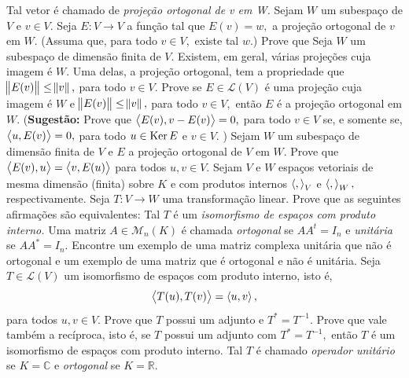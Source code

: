 \documentclass[11pt,a4paper]{article}
\begin{document}
Tal vetor é chamado de \emph{projeção ortogonal de v em W.}
\solucao{}
 Sejam $W$ um subespaço de $V$ e $v \in V.$ Seja $E \colon V \to V$ a função tal que $E(v) = w,$ a projeção
ortogonal de $v$ em $W.$ (Assuma que, para todo $v \in V,$ existe tal $w.$) Prove que 
\solucao{}
 Seja $W$ um subespaço de dimensão finita de $V.$ Existem, em geral, várias projeções cuja imagem é $W.$ Uma delas, a projeção ortogonal, tem a propriedade que $\norm{E(v)} \le \norm{v},$ para
todo $v \in V.$ Prove se $E \in \mathcal{L}(V)$ é uma projeção cuja imagem é $W$ e $\norm{E(v)} \le \norm{v},$ para todo $v \in V,$ então $E$ é a projeção ortogonal em $W.$
(\textbf{Sugestão:} Prove que $\left\langle E(v), v - E(v) \right\rangle = 0,$ para todo $v \in V$ se, e somente se, $\left\langle u, E(v) \right\rangle = 0,$
para todo $u \in \operatorname{Ker} E$ e $v \in V.$ )
\solucao{}
  Sejam $W$ um subespaço de dimensão finita de $V$ e $E$ a projeção ortogonal de $V$ em $W$. Prove que $\left\langle E(v), u \right\rangle = \left\langle v, E(u) \right\rangle$ para todos $u, v \in V.$
\solucao{}
 Sejam $V$ e $W$ espaços vetoriais de mesma dimensão (finita) sobre $K$ e com produtos internos $\left\langle , \right\rangle_V$ e $\left\langle , \right\rangle_W,$ respectivamente. Seja $T : V \rightarrow W$ uma transformação linear. Prove que as
seguintes afirmações são equivalentes: 
Tal $T$ é um \emph{isomorfismo de espaços com produto interno.}
\solucao{}
 Uma matriz $A \in \mathcal{M}_n(K)$ é chamada \emph{ortogonal} se $AA^t = I_n$ e \emph{unitária} se $AA^{*} = I_n.$ Encontre um exemplo de uma matriz complexa unitária que não é ortogonal e um exemplo de uma matriz que é ortogonal e não é unitária.
\solucao{}
 Seja $T \in \mathcal{L}(V)$ um isomorfismo de espaços com produto interno, isto é,
\[\left\langle T(u), T(v) \right\rangle = \left\langle u,v \right\rangle,
\] para todos $u, v \in V.$ Prove que $T$ possui um adjunto e $T^{*} = T^{-1}.$ Prove que vale
também a recíproca, isto é, se $T$ possui um adjunto com $T^{*} = T^{-1},$ então $T$ é um isomorfismo de espaços com produto interno. Tal $T$ é chamado \emph{operador unitário} se $K = \mathbb{C}$ e \emph{ortogonal} se $K = \mathbb{R}.$
\end{document}
